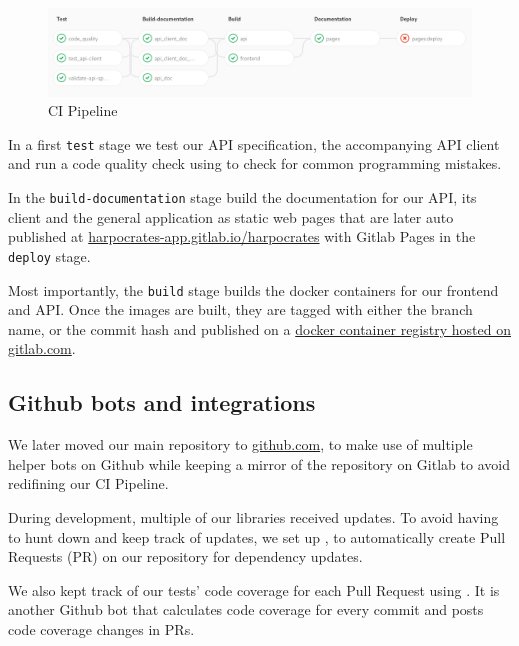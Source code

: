 \documentclass[\version]{l4proj}
\begin{document}
\begin{figure}[H]
    \centering
    \includegraphics[width=0.9\linewidth]{figures/ci.png}
    \caption{CI Pipeline}\label{fig:ci}
\end{figure}

In a first \verb|test| stage we test our API specification, the accompanying API client and run a code quality check using \textcite{Codeclimate2020} to check for common programming mistakes.

In the \verb|build-documentation| stage build the documentation for our API, its client and the general application as static web pages that are later auto published at \href{https://harpocrates-app.gitlab.io/harpocrates/}{harpocrates-app.gitlab.io/harpocrates} with Gitlab Pages in the \verb|deploy| stage.

Most importantly, the \verb|build| stage builds the docker containers for our frontend and API.
Once the images are built, they are tagged with either the branch name, or the commit hash and published on a \href{https://gitlab.com/harpocrates-app/harpocrates/container_registry}{docker container registry hosted on gitlab.com}.

\subsection{Github bots and integrations}

We later moved our main repository to \href{https://github.com/guillaumedsde/Harpocrates}{github.com}, to make use of multiple helper bots on Github while keeping a mirror of the repository on Gitlab to avoid redifining our CI Pipeline.

During development, multiple of our libraries received updates.
To avoid having to hunt down and keep track of updates, we set up \textcite{Dependabot2020}, to automatically create Pull Requests (PR) on our repository for dependency updates.

We also kept track of our tests' code coverage for each Pull Request using \textcite{Codecov2020}.
It is another Github bot that calculates code coverage for every commit and posts code coverage changes in PRs.
\end{document}
